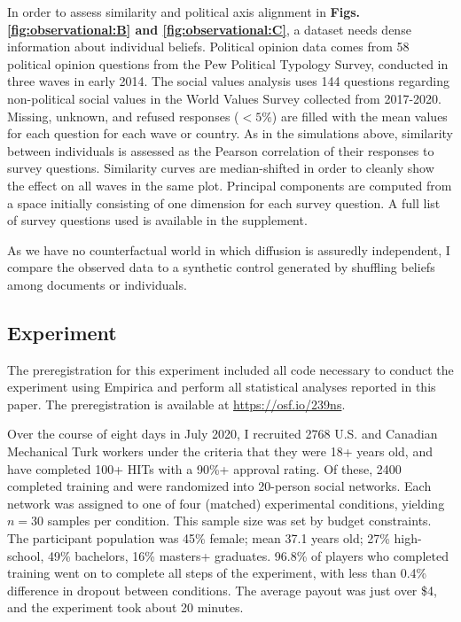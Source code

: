 \documentclass[9pt,twocolumn,twoside,lineno]{pnas-new}
\begin{document}
{In order to assess similarity and political axis alignment in \textbf{Figs. \ref{fig:observational:B} and \ref{fig:observational:C}}, a dataset needs dense information about individual beliefs. Political opinion data comes from 58 political opinion questions from the Pew Political Typology Survey\cite{pew2014}, conducted in three waves in early 2014.
The social values analysis uses 144 questions regarding non-political social values in the World Values Survey\cite{wvsa2020} collected from 2017-2020. Missing, unknown, and refused responses ($<5\%$) are filled with the mean values for each question for each wave or country. As in the simulations above, similarity between individuals is assessed as the Pearson correlation of their responses to survey questions. Similarity curves are median-shifted in order to cleanly show the effect on all waves in the same plot. Principal components are computed from a space initially consisting of one dimension for each survey question. A full list of survey questions used is available in the supplement.

As we have no counterfactual world in which diffusion is assuredly independent, I compare the observed data to a synthetic control generated by shuffling beliefs among documents or individuals.

\subsection*{Experiment}
The preregistration for this experiment included all code necessary to conduct the experiment using Empirica\cite{almaatouq2021empirica} and perform all statistical analyses reported in this paper. The preregistration is available at \href{https://osf.io/239ns}{https://osf.io/239ns}.

Over the course of eight days in July 2020, I recruited 2768 U.S. and Canadian Mechanical Turk workers under the criteria that they were 18+ years old, and have completed 100+ HITs with a 90\%+ approval rating. Of these, 2400 completed training and were randomized into 20-person social networks. Each network was assigned to one of four (matched) experimental conditions, yielding $n=30$ samples per condition. This sample size was set by budget constraints. The participant population was 45\% female; mean 37.1 years old; 27\% high-school, 49\% bachelors, 16\% masters+ graduates. 96.8\% of players who completed training went on to complete all steps of the experiment, with less than 0.4\% difference in dropout between conditions. 
The average payout was just over \$4, and the experiment took about 20 minutes. 

}
\end{document}
